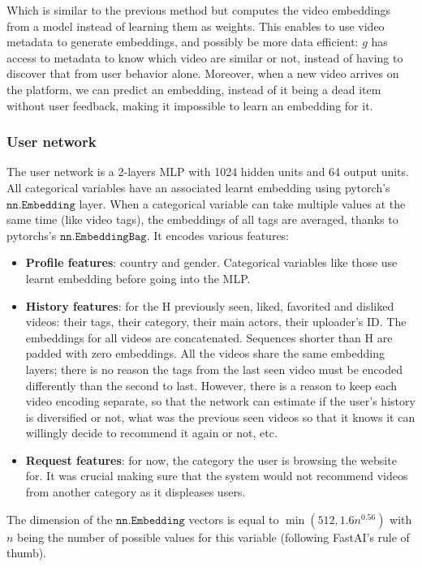 Which is similar to the previous method but computes the video embeddings from a model instead of learning them as weights. This enables to use video metadata to generate embeddings, and possibly be more data efficient: $g$ has access to metadata to know which video are similar or not, instead of having to discover that from user behavior alone. Moreover, when a new video arrives on the platform, we can predict an embedding, instead of it being a dead item without user feedback, making it impossible to learn an embedding for it.

\subsubsection{User network}

The user network is a 2-layers MLP with 1024 hidden units and 64 output units. All categorical variables have an associated learnt embedding using pytorch's $\texttt{nn.Embedding}$ layer. When a categorical variable can take multiple values at the same time (like video tags), the embeddings of all tags are averaged, thanks to pytorchs's $\texttt{nn.EmbeddingBag}$. It encodes various features:

\begin{itemize}
    \item \textbf{Profile features}: country and gender. Categorical variables like those use learnt embedding before going into the MLP.
    \item \textbf{History features}: for the H previously seen, liked, favorited and disliked videos: their tags, their category, their main actors, their uploader's ID. The embeddings for all videos are concatenated. Sequences shorter than H are padded with zero embeddings. All the videos share the same embedding layers; there is no reason the tags from the last seen video must be encoded differently than the second to last. However, there is a reason to keep each video encoding separate, so that the network can estimate if the user's history is diversified or not, what was the previous seen videos so that it knows it can willingly decide to recommend it again or not, etc.
    \item \textbf{Request features}: for now, the category the user is browsing the website for. It was crucial making sure that the system would not recommend videos from another category as it displeases users. 
\end{itemize}

The dimension of the $\texttt{nn.Embedding}$ vectors is equal to $\min(512, 1.6n^{0.56})$ with $n$ being the number of possible values for this variable (following FastAI's rule of thumb).

